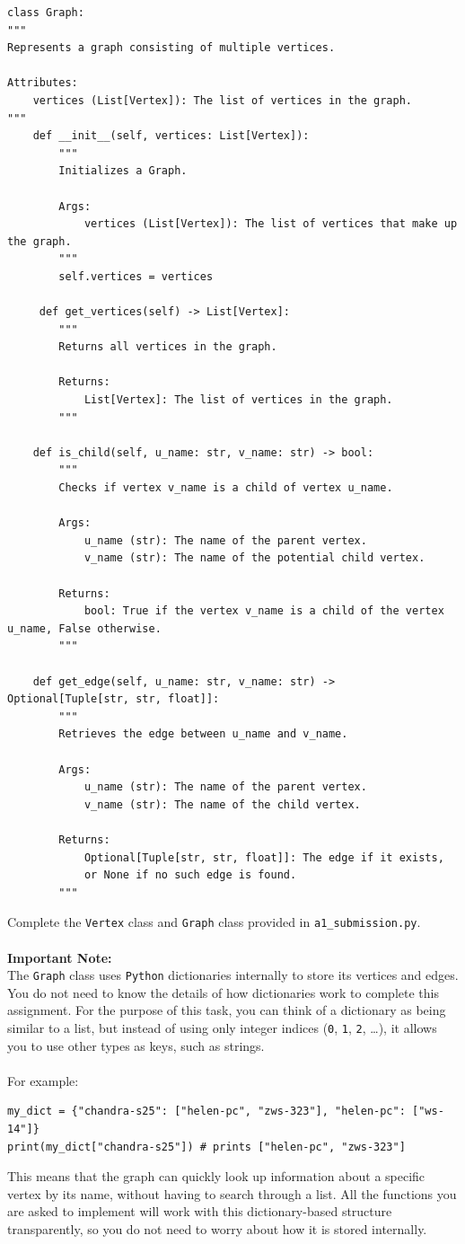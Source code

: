 \documentclass[12pt]{report}
\begin{document}
\begin{lstlisting}
class Graph:
"""
Represents a graph consisting of multiple vertices.

Attributes:
    vertices (List[Vertex]): The list of vertices in the graph.
"""
    def __init__(self, vertices: List[Vertex]):
        """
        Initializes a Graph.
    
        Args:
            vertices (List[Vertex]): The list of vertices that make up the graph.
        """
        self.vertices = vertices

     def get_vertices(self) -> List[Vertex]:
        """
        Returns all vertices in the graph.

        Returns:
            List[Vertex]: The list of vertices in the graph.
        """

    def is_child(self, u_name: str, v_name: str) -> bool:
        """
        Checks if vertex v_name is a child of vertex u_name.

        Args:
            u_name (str): The name of the parent vertex.
            v_name (str): The name of the potential child vertex.

        Returns:
            bool: True if the vertex v_name is a child of the vertex u_name, False otherwise.
        """

    def get_edge(self, u_name: str, v_name: str) -> Optional[Tuple[str, str, float]]:
        """
        Retrieves the edge between u_name and v_name.

        Args:
            u_name (str): The name of the parent vertex.
            v_name (str): The name of the child vertex.

        Returns:
            Optional[Tuple[str, str, float]]: The edge if it exists, 
            or None if no such edge is found.
        """

\end{lstlisting}
Complete the \texttt{Vertex} class and \texttt{Graph} class provided in \texttt{a1\_submission.py}.
\\~\\
\textbf{Important Note:}\\The \texttt{Graph} class uses \texttt{Python} dictionaries internally to store its vertices and edges.  
You do not need to know the details of how dictionaries work to complete this assignment.  
For the purpose of this task, you can think of a dictionary as being similar to a list, but instead of using only integer indices (\texttt{0}, \texttt{1}, \texttt{2}, \dots), it allows you to use other types as keys, such as strings. 
\\~\\
For example:
\begin{lstlisting}
my_dict = {"chandra-s25": ["helen-pc", "zws-323"], "helen-pc": ["ws-14"]}
print(my_dict["chandra-s25"]) # prints ["helen-pc", "zws-323"]
\end{lstlisting}
This means that the graph can quickly look up information about a specific vertex by its name, without having to search through a list. All the functions you are asked to implement will work with this dictionary-based structure transparently, so you do not need to worry about how it is stored internally.
\end{document}
